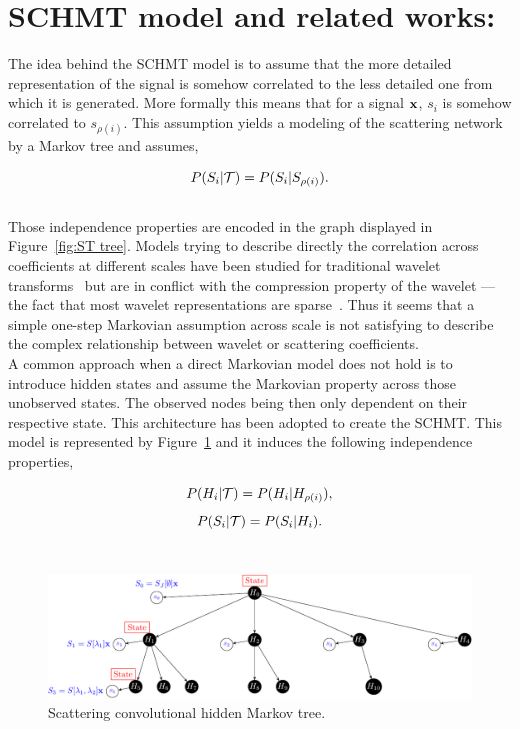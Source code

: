 \documentclass[a4paper,11pt]{report}
\begin{document}
  
  \section{SCHMT model and related works:}
    \label{sec:SCHMT/Rel work}
      
    The idea behind the SCHMT model is to assume that the more detailed representation of the signal is somehow correlated to the less detailed one from which it is generated. More formally this means that for a signal ${\bf x}$, $s_{i}$ is somehow correlated to $s_{\rho(i)}$. This assumption yields a modeling of the scattering network by a Markov tree and assumes,
    
    \begin{equation}
      P(S_{i} |\mathcal{T}) = P(S_{i} | S_{\rho(i)}).
      \label{eq:SMT - false hypo}
    \end{equation}\\

    Those independence properties are encoded in the graph displayed in Figure~\ref{fig:ST tree}. Models trying to describe directly the correlation across coefficients at different scales have been studied for traditional wavelet transforms~\citep{lee1996new} but are in conflict with the compression property of the wavelet ---\ie the fact that most wavelet representations are sparse~\citep{crouse1998wavelet}. Thus it seems that a simple one-step Markovian assumption across scale is not satisfying to describe the complex relationship between wavelet or scattering coefficients.\\
    
    A common approach when a direct Markovian model does not hold is to introduce hidden states and assume the Markovian property across those unobserved states. The observed nodes being then only dependent on their respective state. This architecture has been adopted to create the SCHMT. This model is represented by Figure~\ref{fig:SCHMT 1} and it induces the following independence properties,
    
    \begin{equation}
      P(H_{i} |\mathcal{T}) = P(H_{i} | H_{\rho(i)}),
      \label{eq:SCHMT - hypo 1}
    \end{equation}    
    \begin{equation}
      P(S_{i} |\mathcal{T}) = P(S_{i} | H_{i}).
      \label{eq:SCHMT - hypo 2}
    \end{equation} \\
    
		\begin{figure}[h]
				\begin{center}
					\includegraphics[width=5in]{scat_HMT_crop.pdf}
					\caption{Scattering convolutional hidden Markov tree.}
					\label{fig:SCHMT 1}
				\end{center}
		\end{figure}
		
\end{document}
